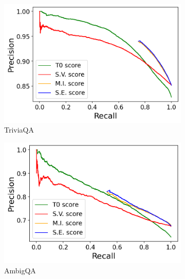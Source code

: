 \documentclass[a4paper]{article}
\theoremstyle{plain}
\theoremstyle{definition}
\theoremstyle{plain}
\begin{document}
\begin{figure}[t]
  \begin{subfigure}{0.24\textwidth}
\includegraphics[width=\textwidth]{PR-TriviaQA-all.png}
    \caption{TriviaQA} \label{fig:PRa}
  \end{subfigure}%
  \hspace*{\fill}   %
  \begin{subfigure}{0.24\textwidth}
       \includegraphics[width=\textwidth]{PR-AmbigQA-all.png}
    \caption{AmbigQA} \label{fig:PRb}
  \end{subfigure}%
  \hspace*{\fill}   %
  \begin{subfigure}{0.24\textwidth}

\end{subfigure}
\end{figure}
\end{document}
